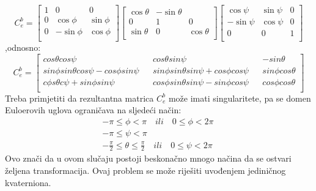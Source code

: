 \begin{equation}    
    C_e^b=\begin{bmatrix}
        1&0&0\\
        0&\cos\phi & \sin\phi \\
        0 & -\sin\phi & \cos\phi \\
    \end{bmatrix}    
    \begin{bmatrix}
        \cos\theta&-\sin\theta&\\
        0&1 & 0 \\
        \sin\theta & 0 & \cos\theta \\
    \end{bmatrix}
    \begin{bmatrix}
        \cos\psi & \sin\psi & 0\\
        -\sin\psi & \cos\psi &0\\
        0&0&1\\
    \end{bmatrix}
\end{equation}
,odnosno:
\begin{equation}
    C_e^b=\begin{bmatrix}
        cos\theta cos\psi && cos\theta sin\psi && -sin\theta\\
        sin\phi sin\theta cos\psi-cos\phi sin\psi && sin\phi sin\theta sin\psi +cos\phi cos\psi&& sin\phi cos\theta\\
        c\phi s\theta c\psi+sin\phi sin\psi && cos\phi sin\theta sin\psi -sin\phi cos\psi&& cos\phi cos\theta\\
    \end{bmatrix}
\end{equation}
Treba primjetiti da rezultantna matrica $C_e^b$ može imati singularitete, pa se domen
Euloerovih uglova ograničava na sljedeći način:
\begin{align*}
    -\pi \leq \phi <\pi \quad ili \quad 0\leq\phi<2\pi \\
    -\pi \leq \psi <\pi \qquad \qquad \qquad \qquad \\
    -\frac{\pi}{2}\leq \theta \leq \frac{\pi}{2} \quad ili \quad 0\leq\psi<2\pi
\end{align*}
Ovo znači da u ovom slučaju postoji beskonačno mnogo načina da se ostvari željena transformacija.
Ovaj problem se može riješiti uvođenjem jediničnog kvaterniona.

